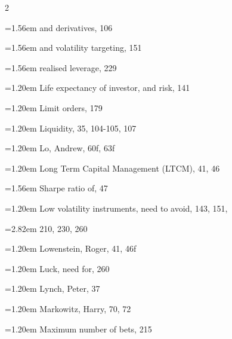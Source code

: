 {\begin{multicols}{2}
\par \noindent\hangindent=1.56em\hspace*{0.36em} and derivatives, 106
\par \noindent\hangindent=1.56em\hspace*{0.36em} and volatility targeting, 151
\par \noindent\hangindent=1.56em\hspace*{0.36em} realised leverage, 229
\par \noindent\hangindent=1.20em\hspace*{0.00em} Life expectancy of investor, and risk, 141
\par \noindent\hangindent=1.20em\hspace*{0.00em} Limit orders, 179
\par \noindent\hangindent=1.20em\hspace*{0.00em} Liquidity, 35, 104-105, 107
\par \noindent\hangindent=1.20em\hspace*{0.00em} Lo, Andrew, 60f, 63f
\par \noindent\hangindent=1.20em\hspace*{0.00em} Long Term Capital Management (LTCM), 41, 46
\par \noindent\hangindent=1.56em\hspace*{0.36em} Sharpe ratio of, 47
\par \noindent\hangindent=1.20em\hspace*{0.00em} Low volatility instruments, need to avoid, 143, 151,
\par \noindent\hangindent=2.82em\hspace*{1.62em} 210, 230, 260
\par \noindent\hangindent=1.20em\hspace*{0.00em} Lowenstein, Roger, 41, 46f
\par \noindent\hangindent=1.20em\hspace*{0.00em} Luck, need for, 260
\par \noindent\hangindent=1.20em\hspace*{0.00em} Lynch, Peter, 37
\par \noindent\hangindent=1.20em\hspace*{0.00em} Markowitz, Harry, 70, 72
\par \noindent\hangindent=1.20em\hspace*{0.00em} Maximum number of bets, 215

\end{multicols}}
